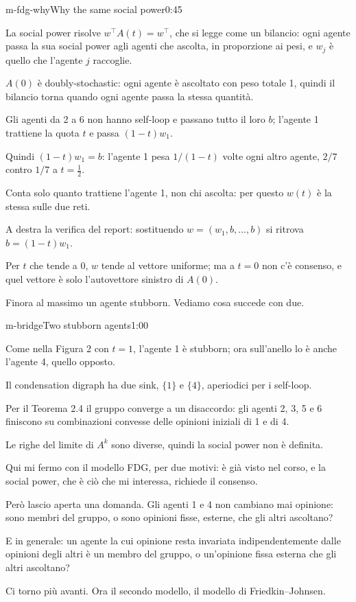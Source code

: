 \begin{slide}{m-fdg-why}{Why the same social power}{0:45}
  \begin{discorso}
    \item La social power risolve $w^\top A(t)=w^\top$, che si legge come un bilancio: ogni agente passa la sua social power agli agenti che ascolta, in proporzione ai pesi, e $w_j$ è quello che l'agente $j$ raccoglie.
    \item $A(0)$ è doubly-stochastic: ogni agente è ascoltato con peso totale 1, quindi il bilancio torna quando ogni agente passa la stessa quantità.
    \item Gli agenti da 2 a 6 non hanno self-loop e passano tutto il loro $b$; l'agente 1 trattiene la quota $t$ e passa $(1-t)w_1$.
    \item Quindi $(1-t)w_1=b$: l'agente 1 pesa $1/(1-t)$ volte ogni altro agente, $2/7$ contro $1/7$ a $t=\tfrac12$.
    \item Conta solo quanto trattiene l'agente 1, non chi ascolta: per questo $w(t)$ è la stessa sulle due reti.
    \item A destra la verifica del report: sostituendo $w=(w_1,b,\dots,b)$ si ritrova $b=(1-t)w_1$.
    \item Per $t$ che tende a 0, $w$ tende al vettore uniforme; ma a $t=0$ non c'è consenso, e quel vettore è solo l'autovettore sinistro di $A(0)$.
    \item Finora al massimo un agente stubborn. Vediamo cosa succede con due.
  \end{discorso}
\end{slide}

\begin{slide}{m-bridge}{Two stubborn agents}{1:00}
  \begin{discorso}
    \item Come nella Figura 2 con $t=1$, l'agente 1 è stubborn; ora sull'anello lo è anche l'agente 4, quello opposto.
    \item Il condensation digraph ha due sink, $\{1\}$ e $\{4\}$, aperiodici per i self-loop.
    \item Per il Teorema 2.4 il gruppo converge a un disaccordo: gli agenti 2, 3, 5 e 6 finiscono su combinazioni convesse delle opinioni iniziali di 1 e di 4.
    \item Le righe del limite di $A^k$ sono diverse, quindi la social power non è definita.
    \item Qui mi fermo con il modello FDG, per due motivi: è già visto nel corso, e la social power, che è ciò che mi interessa, richiede il consenso.
    \item Però lascio aperta una domanda. Gli agenti 1 e 4 non cambiano mai opinione: sono membri del gruppo, o sono opinioni fisse, esterne, che gli altri ascoltano?
    \item E in generale: un agente la cui opinione resta invariata indipendentemente dalle opinioni degli altri è un membro del gruppo, o un'opinione fissa esterna che gli altri ascoltano?
    \item Ci torno più avanti. Ora il secondo modello, il modello di Friedkin–Johnsen.
  \end{discorso}
\end{slide}

